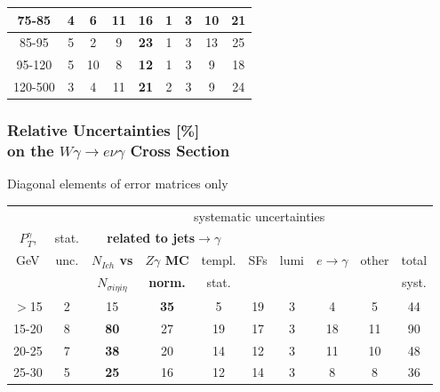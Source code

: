 \begin{frame}
\begin{table}[h]
\begin{center}
\begin{tabular}{|c|c|c|c|c|c|c|c|c|}
    75-85 & 4 & 6 & 11 & {\color{blue}\bfseries{16}} & 1 & 3 & 10 & 21 \\ \hline
    85-95 & 5 & 2 & 9 & {\color{blue}\bfseries{23}} & 1 & 3 & 13 & 25 \\ \hline
    95-120 & 5 & 10 & 8 & {\color{blue}\bfseries{12}} & 1 & 3 & 9 & 18 \\ \hline
    120-500 & 3 & 4 & 11 & {\color{blue}\bfseries{21}} & 2 & 3 & 9 & 24 \\ \hline
  \end{tabular}
  \label{tab:systInPercent_MUON_WGamma}
  \end{center}
\end{table}
\end{frame}%

\begin{frame}\frametitle{Relative Uncertainties [\%]\\
  on the $W\gamma\rightarrow e\nu\gamma$ Cross Section}
\footnotesize
Diagonal elements of error matrices only
\begin{table}[h]
  \tiny
  \begin{center}
   \begin{tabular}{|c|c|c|c|c|c|c|c|c|c|}
   \hline
                  &       & \multicolumn{8}{|c|}{systematic uncertainties}     \\
    $P_T^{\gamma}$, & stat. & \multicolumn{3}{|c|}{\color{blue}\bfseries{related to jets$\rightarrow\gamma$}} &  &  &  &  & \\
    GeV           & unc.  & {\color{blue}\bfseries{$N_{Ich}$ vs}}          &{\color{blue}\bfseries{$Z\gamma$ MC}} & templ. & SFs & lumi &$e\rightarrow\gamma$ & other & total\\ 
                  &       & {\color{blue}\bfseries{$N_{\sigma{i\eta i\eta}}$}} & {\color{blue}\bfseries{norm.}}       & stat.  &  &  & &  & syst.\\ \hline
    $>$15  & 2 & 15 & {\color{blue}\bfseries{35}} & 5 & 19 & 3 & 4 & 5 & 44 \\ \hline
    15-20 & 8 & {\color{blue}\bfseries{80}} & 27 & 19 & 17 & 3 & 18 & 11 & 90 \\ \hline
    20-25 & 7 & {\color{blue}\bfseries{38}} & 20 & 14 & 12 & 3 & 11 & 10 & 48 \\ \hline
    25-30 & 5 & {\color{blue}\bfseries{25}} & 16 & 12 & 14 & 3 & 8 & 8 & 36 \\ \hline

\end{tabular}
\end{center}
\end{table}
\end{frame}
